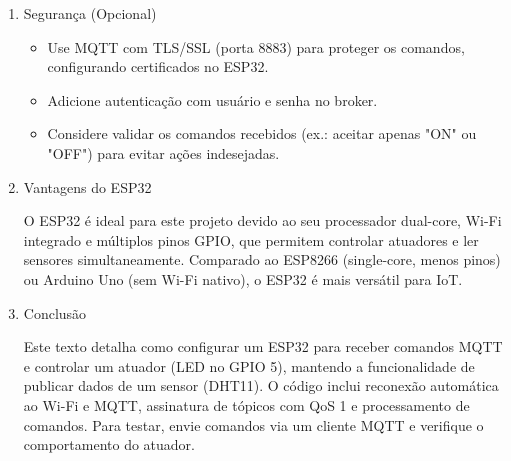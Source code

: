 \documentclass[a4paper]{article}
\begin{document}
\begin{answer}
\begin{enumerate}
            \item{Segurança (Opcional)}

                \begin{itemize}
                    \item Use MQTT com TLS/SSL (porta 8883) para proteger os comandos, configurando certificados no ESP32.
                    \item Adicione autenticação com usuário e senha no broker.
                    \item Considere validar os comandos recebidos (ex.: aceitar apenas "ON" ou "OFF") para evitar ações indesejadas.
                \end{itemize}

            \item{Vantagens do ESP32}

            O ESP32 é ideal para este projeto devido ao seu processador dual-core, Wi-Fi integrado e múltiplos pinos GPIO, que permitem controlar atuadores e ler sensores simultaneamente. Comparado ao ESP8266 (single-core, menos pinos) ou Arduino Uno (sem Wi-Fi nativo), o ESP32 é mais versátil para IoT.

        \item {Conclusão}

            Este texto detalha como configurar um ESP32 para receber comandos MQTT e controlar um atuador (LED no GPIO 5), mantendo a funcionalidade de publicar dados de um sensor (DHT11). O código inclui reconexão automática ao Wi-Fi e MQTT, assinatura de tópicos com QoS 1 e processamento de comandos. Para testar, envie comandos via um cliente MQTT e verifique o comportamento do atuador.
        \end{enumerate}
    \end{answer}
\end{document}
